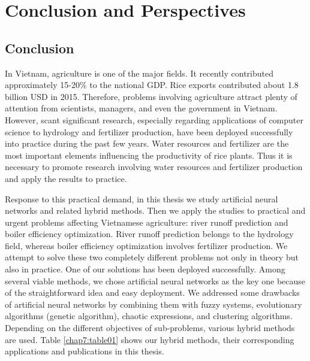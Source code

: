 \chapter{Conclusion and Perspectives}
\label{conclusion}

\section{Conclusion}

In Vietnam, agriculture is one of the major fields. It recently contributed approximately 15-20$\%$ to the national GDP. Rice exports contributed about 1.8 billion USD in 2015. Therefore, problems involving agriculture attract plenty of attention from scientists, managers, and even the government in Vietnam. However, scant significant research, especially regarding applications of computer science to hydrology and fertilizer production, have been deployed successfully into practice during the past few years. Water resources and fertilizer are the most important elements influencing the productivity of rice plants. Thus it is necessary to promote research involving water resources and fertilizer production and apply the results to practice.

Response to this practical demand, in this thesis we study artificial neural networks and related hybrid methods. Then we apply the studies to practical and urgent problems affecting Vietnamese agriculture: river runoff prediction and boiler efficiency optimization. River runoff prediction belongs to the hydrology field, whereas boiler efficiency optimization involves fertilizer production. We attempt to solve these two completely different problems not only in theory but also in practice. One of our solutions has been deployed successfully. Among several viable methods, we chose artificial neural networks as the key one because of the straightforward idea and easy deployment. We addressed some drawbacks of artificial neural networks by combining them with fuzzy systems, evolutionary algorithms (genetic algorithm), chaotic expressions, and clustering algorithms. Depending on the different objectives of sub-problems, various hybrid methods are used. Table \ref{chap7:table01} shows our hybrid methods, their corresponding applications and publications in this thesis.

